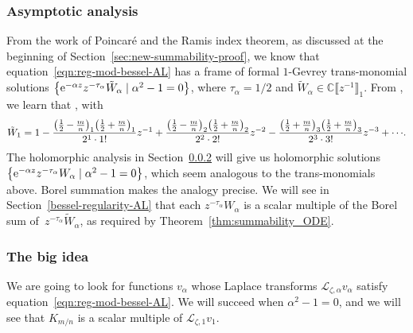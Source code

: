 \documentclass[10pt,a4paper]{amsart}
\newcommand{\C}{\mathbb{C}}
\newcommand{\series}[1]{\tilde{#1}}
\newcommand{\laplace}{\mathcal{L}}
\numberwithin{equation}{section}
\begin{document}
\subsubsection{Asymptotic analysis}\label{sec:asympt-AL}
%
From the work of Poincar\'e and the Ramis index theorem, as discussed at the beginning of Section~\ref{sec:new-summability-proof}, we know that equation~\eqref{eqn:reg-mod-bessel-AL} has a frame of formal $1$-Gevrey trans-monomial solutions
$\big\{ {\rm e}^{-\alpha z} z^{-\tau_\alpha} \series{W}_\alpha \mid \alpha^2 - 1 = 0 \big\}$,
where $\tau_\alpha = 1/2$ and $\series{W}_\alpha\in\C\big\llbracket z^{-1} \big\rrbracket_1$. From \cite[equations~(10.40.2) and (10.17.1)]{dlmf}, we learn that \smash{$K_{m/n} \sim \bigl(\frac{\pi}{2}\bigr)^{1/2} {\rm e}^{-z} z^{-1/2} \series{W}_1$}, with
\begin{gather*}%
\series{W}_1 = 1 - \frac{\bigl(\frac{1}{2}\hspace{-0.5pt}-\hspace{-0.5pt}\frac{m}{n}\bigr)_1 \bigl(\frac{1}{2}\hspace{-0.5pt}+\hspace{-0.5pt}\frac{m}{n}\bigr)_1}{2^1 \cdot 1!} z^{-1} + \frac{\bigl(\frac{1}{2}\hspace{-0.5pt}-\hspace{-0.5pt}\frac{m}{n}\bigr)_2 \bigl(\frac{1}{2}\hspace{-0.5pt}+\hspace{-0.5pt}\frac{m}{n}\bigr)_2}{2^2 \cdot 2!} z^{-2} - \frac{\bigl(\frac{1}{2}\hspace{-0.5pt}+\hspace{-0.5pt}\frac{m}{n}\bigr)_3 \bigl(\frac{1}{2}\hspace{-0.5pt}+\hspace{-0.5pt}\frac{m}{n}\bigr)_3}{2^3 \cdot 3!} z^{-3} + \cdots\!.
\end{gather*}
The holomorphic analysis in Section~\ref{big-idea} will give us holomorphic solutions
$\big\{ {\rm e}^{-\alpha z} z^{-\tau_\alpha} W_\alpha \mid \alpha^2 - 1 = 0 \big\}$,
which seem analogous to the trans-monomials above. Borel summation makes the analogy precise. We will see in Section~\ref{bessel-regularity-AL} that each $z^{-\tau_\alpha} W_\alpha$ is a scalar multiple of the Borel sum of~$z^{-\tau_\alpha} \series{W}_\alpha$, as required by Theorem~\ref{thm:summability_ODE}.
%
\subsubsection{The big idea}\label{big-idea}
%
We are going to look for functions $v_\alpha$ whose Laplace transforms $\laplace_{\zeta, \alpha} v_\alpha$ satisfy equation~\eqref{eqn:reg-mod-bessel-AL}. We will succeed when $\alpha^2 - 1 = 0$, and we will see that $K_{m/n}$ is a scalar multiple of $\laplace_{\zeta, 1} v_1$.
\end{document}
